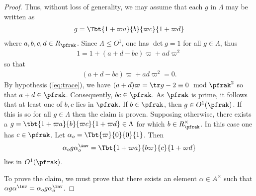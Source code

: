 \begin{proof}
	Thus, without loss of generality, we may assume that each $g$ in $\Lambda$ may be written as
	\begin{align*}
		g = \Tbt{1+\varpi a}{b}{\varpi c}{1+\varpi d}
	\end{align*}
	where $a,b,c,d \in R_\pfrak$.
	Since $\Lambda \leq O^1$, one has $\det g = 1 $ for all $g\in \Lambda$, thus
	\begin{align*}
		1 = 1 + (a+d - bc) \varpi + ad \varpi^2
	\end{align*}
	so that
	\begin{align}\label{eq:MandarinLeyden}
		(a+d - bc) \varpi + ad \varpi^2 =0.
	\end{align}
	By hypothesis (\ref{eq:trace}), we have $(a+d)\varpi = \tr g -2 \equiv 0 \mod \pfrak^2$ so that $a+d \in \pfrak$. Consequently, $bc \in \pfrak$. As $\pfrak$ is prime, it follows that at least one of $b,c$ lies in $\pfrak$. If $b \in \pfrak$, then $g \in O^1(\pfrak)$. If this is so for all $g \in \Lambda$ then the claim is proven. Supposing otherwise, there exists a $g=\tbt{1+\varpi a}{b}{\varpi c}{1+\varpi d} \in \Lambda$ for which $b \in R_\pfrak^\times$. In this case one has $c \in \pfrak$. Let $\alpha_o = \Tbt{\varpi}{0}{0}{1}$. Then
	\begin{align*}
		\alpha_o g\alpha_o^\inv  = \Tbt{1+\varpi a}{b\varpi}{c}{1+\varpi d}
	\end{align*}
	lies in $O^1(\pfrak)$.

	To prove the claim, we must prove that there exists an element $\alpha \in A^\times $ such that $\alpha g \alpha^\inv =  \alpha_o g \alpha_o^\inv$.














\end{proof}